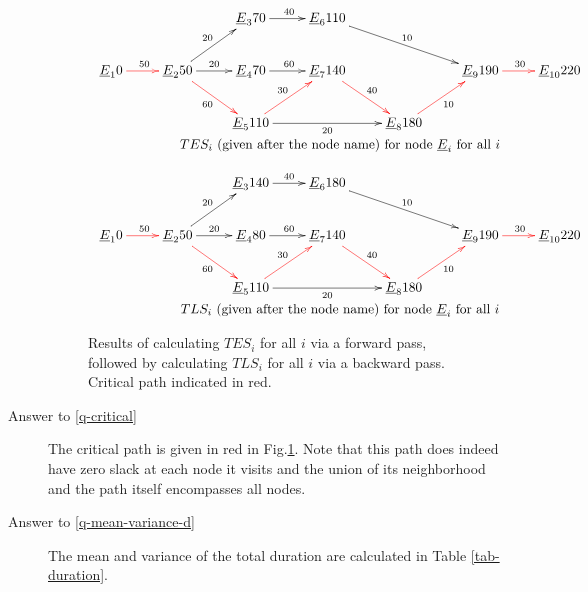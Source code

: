 \begin{description}
\begin{figure}[h!]
\centering
$$
\begin{array}{c}
\xymatrix{
&&\rvE_3\ar[r]^{40}70
&\rvE_6\ar[drr]^{10}110
\\
\rvE_1\ar@[red][r]^{50}0
&\rvE_2\ar[ru]^{20}\ar@[red][rd]_{60}\ar[r]^{20}50
&\rvE_4\ar[r]^{60}70
&\rvE_7\ar@[red][rd]^{40}140
&&\rvE_9\ar@[red][r]^{30}190
&\rvE_{10}220
\\
&&\rvE_5\ar@[red][ru]^{30}\ar[rr]_{20}110
&&\rvE_8\ar@[red][ru]_{10}180
}
\\
TES_i \text{ (given after the node name) for node $\rvE_i$ for all $i$}
\\
\\
\xymatrix{
&&\rvE_3\ar[r]^{40}140
&\rvE_6\ar[drr]^{10}180
\\
\rvE_1\ar@[red][r]^{50}0
&\rvE_2\ar[ru]^{20}\ar@[red][rd]_{60}\ar[r]^{20}50
&\rvE_4\ar[r]^{60}80
&\rvE_7\ar@[red][rd]^{40}140
&&\rvE_9\ar@[red][r]^{30}190
&\rvE_{10}220
\\
&&\rvE_5\ar@[red][ru]^{30}\ar[rr]_{20}110
&&\rvE_8\ar@[red][ru]_{10}180
}
\\
TLS_i \text{ (given after the node name) for node $\rvE_i$ for all $i$}
\end{array}
$$
\caption{Results of calculating
$TES_i$  for all $i$ via a forward
pass, followed by calculating
$TLS_i$ for all $i$
via a backward pass.
Critical path indicated in red.}
\label{fig-pert-times}
\end{figure}

\item[Answer to \ref{q-critical}]
The critical path is given 
in red in Fig.\ref{fig-pert-times}.
Note that this path does indeed
have zero slack at each node it
visits and the union of
its neighborhood and 
the path itself encompasses all nodes.
\item[Answer to \ref{q-mean-variance-d}]

The mean
and variance of
the total duration
are calculated in Table \ref{tab-duration}.


\end{description}
